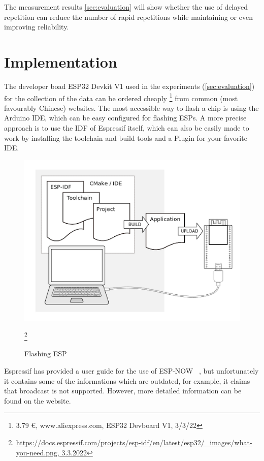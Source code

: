 The measurement results \cref{sec:evaluation} will show whether the use of delayed repetition 
can reduce the number of rapid repetitions while maintaining or even improving reliability.

\section{Implementation}

The developer boad ESP32 Devkit V1 used in the experiments (\cref{sec:evaluation}) for the collection of the data
can be ordered cheaply 
\footnote{3.79 €, www.aliexpress.com, ESP32 Devboard V1, 3/3/22}
from common (most favourably Chinese) websites. 
The most accessible way to flash a chip is using the Arduino IDE, which can be easy configured for flashing ESPs.
A more precise approach is to use the IDF of Espressif itself, 
which can also be easily made to work by installing the toolchain and build tools and a Plugin for your favorite IDE.

\begin{figure}[h]
	\centering
	\includegraphics[scale=0.4]{figures/ESP-ISF.png}
	\caption{Flashing ESP}
	\label{fig:ESP-IDF}
	\footnote{\url{https://docs.espressif.com/projects/esp-idf/en/latest/esp32/_images/what-you-need.png, 3.3.2022}}
\end{figure}

Espressif has provided a user guide for the use of ESP-NOW ~\cite{ESPNOWGuide},
but unfortunately it contains some of the informations which are outdated, 
for example, it claims that broadcast is not supported.
However, more detailed information can be found on the website.

